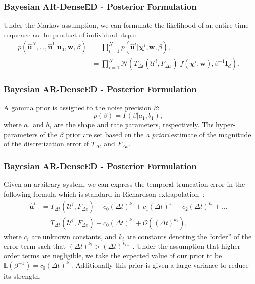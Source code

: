 \documentclass{beamer}
\theoremstyle{remark}
\begin{document}
\begin{frame}
\frametitle{Bayesian AR-DenseED - Posterior Formulation}
Under the Markov assumption, we can formulate the likelihood of an entire time-sequence as the product of individual steps:
\begin{align}
    p\left(\hat{\bm{u}}^{N}, \ldots, \hat{\bm{u}}^{1}|\bm{u}_{0},\textbf{w}, \beta\right) &= \prod_{i=1}^{N}p\left(\hat{\bm{u}}^{i}| \bm{\chi}^{i},\textbf{w}, \beta\right), \nonumber \\
    &= \prod_{i=1}^{N}\mathcal{N}\left(T_{\Delta t}\left(\bm{\mathcal{U}}^{i}, F_{\Delta x}\right)| f\left(\bm{\chi}^{i},\textbf{w}\right), \beta^{-1}\bm{I}_{d}\right). \label{eq:likelihood}
\end{align}
\end{frame}


\begin{frame}
\frametitle{Bayesian AR-DenseED - Posterior Formulation}
A gamma prior is assigned to the noise precision $\beta$:
\begin{equation}
    p(\beta)=\Gamma\left(\beta|a_{1},b_{1}\right),
\end{equation}
where $a_{1}$ and $b_{1}$ are the shape and rate parameters, respectively.
The hyper-parameters of the $\beta$ prior are set based on the \textit{a priori} estimate of the magnitude of the discretization error of $T_{\Delta t}$ and  $F_{\Delta x}$.

\end{frame}

\begin{frame}
\frametitle{Bayesian AR-DenseED - Posterior Formulation}
Given an arbitrary system, we can express the temporal truncation error in the following formula which is standard in Richardson extrapolation~\cite{richardson1927viii}:
 \begin{align}
    \hat{\bm{u}}^{i} &= T_{\Delta t}\left(\bm{\mathcal{U}}^{i}, F_{\Delta x}\right) + c_{0}\left(\Delta t\right)^{k_{0}} + c_{1}\left(\Delta t\right)^{k_{1}} + c_{2}\left(\Delta t\right)^{k_{2}} + \dots \nonumber \\
     &= T_{\Delta t}\left(\bm{\mathcal{U}}^{i}, F_{\Delta x}\right) + c_{0}\left(\Delta t\right)^{k_{0}} + \mathcal{O}\left(\left(\Delta t\right)^{k_{1}}\right),\label{eq:richard0}
\end{align}
where $c_{i}$ are unknown constants, and $k_{i}$ are constants denoting the ``order'' of the error term such that $\left(\Delta t\right)^{k_{i}} > \left(\Delta t\right)^{k_{i+1}}$.
Under the assumption that higher-order terms are negligible, we take the expected value of our prior to be $\mathbb{E}\left(\beta^{-1}\right)=c_{0}\left(\Delta t\right)^{k_{0}}$. 
Additionally this prior is given a large variance to reduce its strength.
\end{frame}
\end{document}
